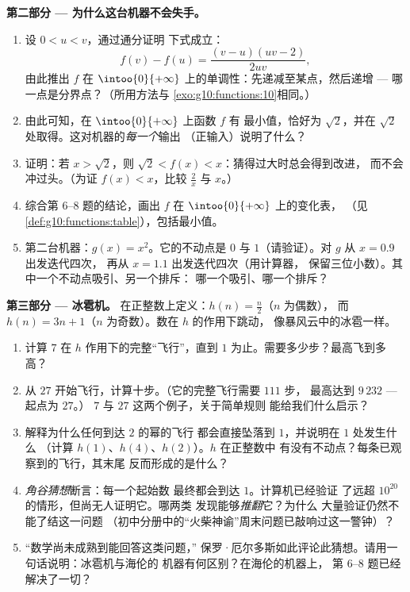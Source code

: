 \begin{problem}
\medskip
\noindent\textbf{第二部分 --- 为什么这台机器不会失手。}
\begin{enumerate}[resume]
  \item 设 $0 < u < v$，通过通分证明
        下式成立：
        \[
        f(v) - f(u) = \frac{(v - u)(uv - 2)}{2uv} ,
        \]
        由此推出 $f$ 在
        $\intoo{0}{+\infty}$ 上的单调性：先递减至某点，然后递增 ---
        哪一点是分界点？（所用方法与
        \cref{exo:g10:functions:10}相同。）
  \item 由此可知，在 $\intoo{0}{+\infty}$ 上函数 $f$ 有
        最小值，恰好为 $\sqrt2$，并在
        $\sqrt2$ 处取得。这对机器的\emph{每一个}输出
        （正输入）说明了什么？
  \item 证明：若 $x > \sqrt2$，则
        $\sqrt2 < f(x) < x$：猜得过大时总会得到改进，
        而不会冲过头。（为证 $f(x) < x$，比较 $\frac2x$ 与
        $x$。）
  \item 综合第 6--8 题的结论，画出 $f$ 在
        $\intoo{0}{+\infty}$ 上的变化表，
        （见\cref{def:g10:functions:table}），包括最小值。
  \item 第二台机器：$g(x) = x^2$。它的不动点是
        $0$ 与 $1$（请验证）。对 $g$ 从 $x = 0.9$ 出发迭代四次，
        再从 $x = 1.1$ 出发迭代四次（用计算器，
        保留三位小数）。其中一个不动点吸引、另一个排斥：
        哪一个吸引、哪一个排斥？
\end{enumerate}

\medskip
\noindent\textbf{第三部分 --- 冰雹机。}
在正整数上定义：$h(n) = \frac n2$（$n$ 为偶数），
而 $h(n) = 3n + 1$（$n$ 为奇数）。数在 $h$ 的作用下跳动，
像暴风云中的冰雹一样。
\begin{enumerate}[resume]
  \item 计算 $7$ 在 $h$ 作用下的完整“飞行”，直到
        $1$ 为止。需要多少步？最高飞到多高？
  \item 从 $27$ 开始飞行，计算十步。（它的完整飞行需要 $111$ 步，
        最高达到 $9\,232$ --- 起点为 $27$。）
        $7$ 与 $27$ 这两个例子，关于简单规则
        能给我们什么启示？
  \item 解释为什么任何到达 $2$ 的幂的飞行
        都会直接坠落到 $1$，并说明在 $1$ 处发生什么
        （计算 $h(1)$、$h(4)$、$h(2)$）。$h$ 在正整数中
        有没有不动点？每条已观察到的飞行，其末尾
        反而形成的是什么？
  \item \emph{角谷猜想}断言：每一个起始数
        最终都会到达 $1$。计算机已经验证
        了远超 $10^{20}$ 的情形，但尚无人证明它。哪两类
        发现能够\emph{推翻}它？为什么
        大量验证仍然不能了结这一问题
        （初中分册中的“火柴神谕”周末问题已敲响过这一警钟）？
  \item “数学尚未成熟到能回答这类问题，”
        保罗·厄尔多斯如此评论此猜想。请用一句话说明：冰雹机与海伦的
        机器有何区别？在海伦的机器上，
        第 6--8 题已经解决了一切？
\end{enumerate}


\end{problem}

